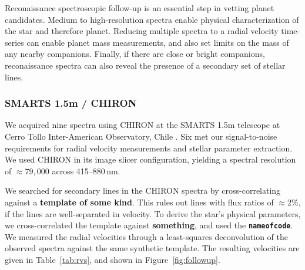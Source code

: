 \documentclass[12pt,twocolumn,tighten]{aastex63}
\begin{document}
Reconaissance spectroscopic follow-up is an essential step in vetting
planet candidates.  Medium to high-resolution spectra enable physical
characterization of the star and therefore planet.  Reducing multiple
spectra to a radial velocity time-series can enable planet mass
measurements, and also set limits on the mass of any nearby
companions.  Finally, if there are close or bright companions,
reconaissance spectra can also reveal the presence of a secondary set
of stellar lines.

\subsubsection{SMARTS 1.5m / CHIRON}
\label{subsec:chiron}

We acquired nine spectra using CHIRON at the SMARTS 1.5m telescope at
Cerro Tollo Inter-American Observatory, Chile
\citep{tokovinin_chironfiber_2013}.  Six met our signal-to-noise
requirements for radial velocity measurements and stellar parameter
extraction.  We used CHIRON in its image slicer configuration,
yielding a spectral resolution of $\approx 79{,}000$ across
415--880$\,$nm.

 We searched for secondary lines in
the CHIRON spectra by cross-correlating against a {\bf template of
some kind}.  This rules out lines with flux ratios of $\approx 2\%$,
if the lines are well-separated in velocity.  To derive the star's
physical parameters, we cross-correlated the template against {\bf
something}, and used the {\bf \texttt{nameofcode}}.  We measured the
radial velocities through a least-squares deconvolution of the
observed spectra against the same synthetic template.  The resulting
velocities are given in Table~\ref{tab:rvs}, and shown in
Figure~\ref{fig:followup}.
\end{document}
